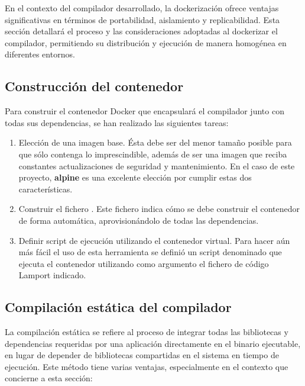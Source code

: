 En el contexto del compilador desarrollado, la dockerización ofrece ventajas significativas en términos de portabilidad, aislamiento y replicabilidad. Esta sección detallará el proceso y las consideraciones adoptadas al dockerizar el compilador, permitiendo su distribución y ejecución de manera homogénea en diferentes entornos.

\subsection{Construcción del contenedor}
Para construir el contenedor Docker que encapsulará el compilador junto con todas sus dependencias, se han realizado las siguientes tareas:

\begin{enumerate}
    \item Elección de una imagen base. Ésta debe ser del menor tamaño posible para que sólo contenga lo imprescindible, además de ser una imagen que reciba constantes actualizaciones de seguridad y mantenimiento. En el caso de este proyecto, \textbf{alpine} es una excelente elección por cumplir estas dos características.
    \item Construir el fichero . Este fichero indica cómo se debe construir el contenedor de forma automática, aprovisionándolo de todas las dependencias.
    \item Definir script de ejecución utilizando el contenedor virtual. Para hacer aún más fácil el uso de esta herramienta se definió un script denominado  que ejecuta el contenedor utilizando como argumento el fichero de código Lamport indicado.
\end{enumerate}

\subsection{Compilación estática del compilador}
La compilación estática se refiere al proceso de integrar todas las bibliotecas y dependencias requeridas por una aplicación directamente en el binario ejecutable, en lugar de depender de bibliotecas compartidas en el sistema en tiempo de ejecución. Este método tiene varias ventajas, especialmente en el contexto que concierne a esta sección:

